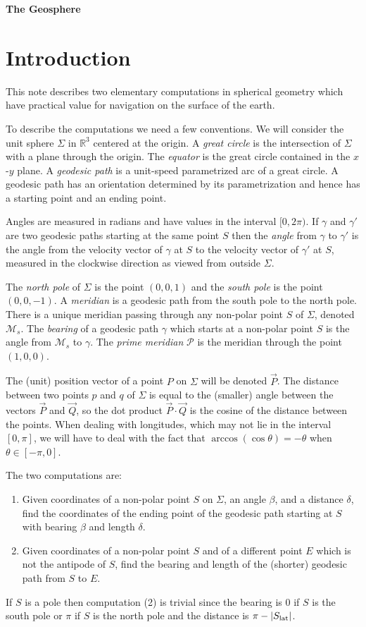 \documentclass[12pt]{article}
\newcommand\lat[1]{{#1}_{\rm lat}}
\begin{document}
\centerline{\Large\bf The Geosphere}
\section{Introduction}

This note describes two elementary computations in spherical geometry which have
practical value for navigation on the surface of the earth.

To describe the computations we need a few conventions. We will consider the
unit sphere $\Sigma$ in ${\mathbb R}^3$ centered at the origin. A {\it great
  circle} is the intersection of $\Sigma$ with a plane through the origin. The
{\it equator} is the great circle contained in the $x$-$y$ plane. A {\it geodesic path}
is a unit-speed parametrized arc of a great circle. A geodesic path has an
orientation determined by its parametrization and hence has a starting point and
an ending point.

Angles are measured in radians and have values in the interval $[0, 2\pi)$. If
$\gamma$ and $\gamma'$ are two geodesic paths starting at the same point $S$
then the {\it angle} from $\gamma$ to $\gamma'$ is the angle from the velocity
vector of $\gamma$ at $S$ to the velocity vector of $\gamma'$ at $S$, measured in
the clockwise direction as viewed from outside $\Sigma$.

The {\it north pole} of $\Sigma$ is the point $(0, 0, 1)$ and the {\it south
  pole} is the point $(0, 0, -1)$. A {\it meridian} is a geodesic path from the
south pole to the north pole. There is a unique meridian passing through any
non-polar point $S$ of $\Sigma$, denoted $\mathcal{M}_s$. The {\it bearing} of a
geodesic path $\gamma$ which starts at a non-polar point $S$ is the angle from
$\mathcal{M}_s$ to $\gamma$. The {\it prime meridian} $\mathcal P$ is the
meridian through the point $(1, 0, 0)$.

The (unit) position vector of a point $P$ on $\Sigma$ will be denoted
$\vec{P}$.  The distance between two points $p$ and $q$ of $\Sigma$ is
equal to the (smaller) angle between the vectors $\vec{P}$ and
$\vec{Q}$, so the dot product $\vec{P}\cdot \vec{Q}$ is the cosine of
the distance between the points.  When dealing with longitudes, which
may not lie in the interval $[0, \pi]$, we will have
to deal with the fact that $\arccos(\cos \theta) = -\theta$ when
$\theta\in [-\pi, 0]$.

The two computations are:
\begin{enumerate}[label={(\arabic*)}]
\item Given coordinates of a non-polar point $S$ on $\Sigma$, an angle
  $\beta$, and a distance $\delta$, find the coordinates of the ending point of the
  geodesic path starting at $S$ with bearing $\beta$ and length $\delta$.
\item Given coordinates of a non-polar point $S$ and of a different point
  $E$ which is not the antipode of $S$, find the bearing and length of
  the (shorter) geodesic path from $S$ to $E$.
\end{enumerate}
If $S$ is a pole then computation (2) is trivial since the bearing is $0$
if $S$ is the south pole or $\pi$ if $S$ is the north pole and the
distance is $\pi - |\lat S|$.
\end{document}
